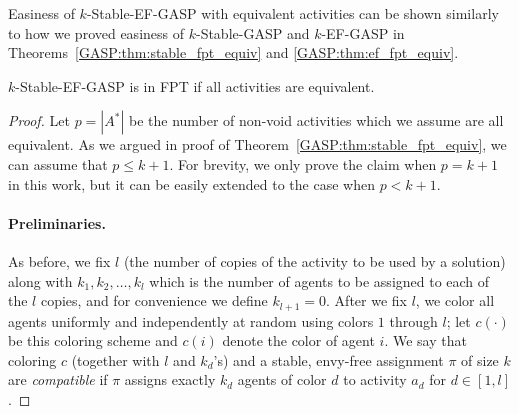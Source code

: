 Easiness of $k$-Stable-EF-GASP with equivalent activities can be shown similarly to how we proved easiness of $k$-Stable-GASP and $k$-EF-GASP in Theorems~\ref{GASP:thm:stable_fpt_equiv} and \ref{GASP:thm:ef_fpt_equiv}.

\begin{theorem} \label{GASP:thm:stable_ef_equiv_fpt}
$k$-Stable-EF-GASP is in FPT if all activities are equivalent.
\end{theorem}
\begin{proof}
	Let $p = |A^*|$ be the number of non-void activities which we assume are all equivalent. As we argued in proof of Theorem~\ref{GASP:thm:stable_fpt_equiv}, we can assume that $p \leq k+1$. For brevity, we only prove the claim when $p = k+1$ in this work, but it can be easily extended to the case when $p < k + 1$.

	\paragraph{Preliminaries.}
	As before, we fix $l$ (the number of copies of the activity to be used by a solution) along with $k_1, k_2, \dots, k_l$ which is the number of agents to be assigned to each of the $l$ copies, and for convenience we define $k_{l+1}=0$.
	After we fix $l$, we color all agents uniformly and independently at random using colors $1$ through $l$; let $c(\cdot)$ be this coloring scheme and $c(i)$ denote the color of agent $i$. 
	We say that coloring $c$ (together with $l$ and $k_d$'s) and a stable, envy-free assignment $\pi$ of size $k$ are {\em compatible} if $\pi$ assigns exactly $k_d$ agents of color $d$ to activity $a_d$ for $d\in [1, l]$.


\end{proof}

